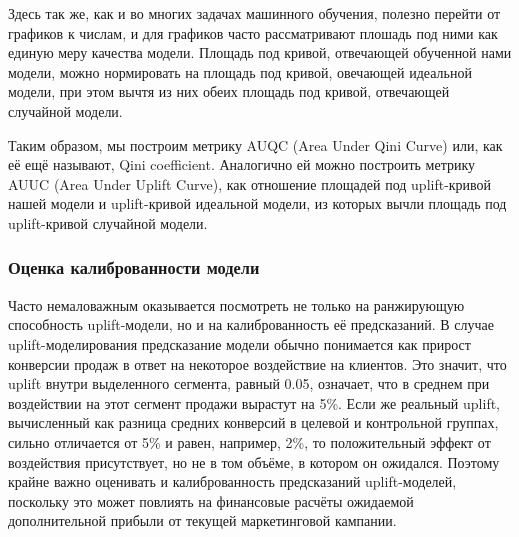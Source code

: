 Здесь так же, как и во многих задачах машинного обучения, полезно перейти от графиков к числам, и для графиков часто рассматривают плошадь под ними как единую меру качества модели. Площадь под кривой, отвечающей обученной нами модели, можно нормировать на площадь под кривой, овечающей идеальной модели, при этом вычтя из них обеих площадь под кривой, отвечающей случайной модели.

Таким образом, мы построим метрику AUQC (Area Under Qini Curve) или, как её ещё называют, Qini coefficient. Аналогично ей можно построить метрику AUUC (Area Under Uplift Curve), как отношение площадей под uplift-кривой нашей модели и uplift-кривой идеальной модели, из которых вычли площадь под uplift-кривой случайной модели.

\subsubsection*{Оценка калиброванности модели}

Часто немаловажным оказывается посмотреть не только на ранжирующую способность uplift-модели, но и на калиброванность её предсказаний. В случае uplift-моделирования предсказание модели обычно понимается как прирост конверсии продаж в ответ на некоторое воздействие на клиентов. Это значит, что uplift внутри выделенного сегмента, равный 0.05, означает, что в среднем при воздействии на этот сегмент продажи вырастут на 5\%. Если же реальный uplift, вычисленный как разница средних конверсий в целевой и контрольной группах, сильно отличается от 5\% и равен, например, 2\%, то положительный эффект от воздействия присутствует, но не в том объёме, в котором он ожидался. Поэтому крайне важно оценивать и калиброванность предсказаний uplift-моделей, поскольку это может повлиять на финансовые расчёты ожидаемой дополнительной прибыли от текущей маркетинговой кампании.


